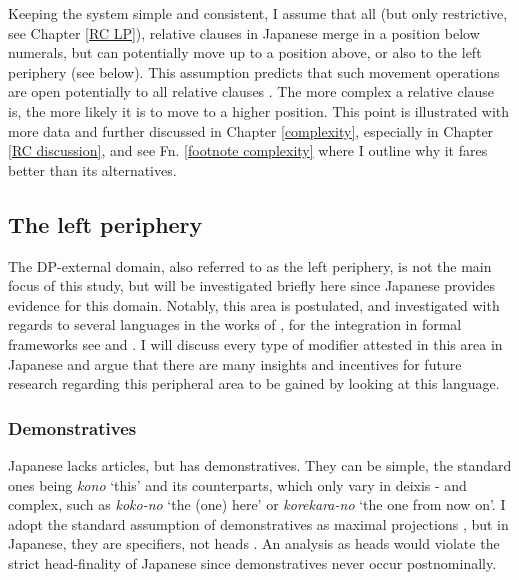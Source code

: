 \documentclass [output=book,colorlinks,citecolor=brown]{langscibook}
\begin{document}
Keeping the system simple and consistent, I assume that all (but only restrictive, see Chapter \ref{RC LP}), relative clauses in Japanese merge in a position below numerals, but can potentially move up to a position above, or also to the left periphery (see below). This assumption predicts that such movement operations are open potentially to all relative clauses \citep{kim:2019:syntax}. The more complex a relative clause is, the more likely it is to move to a higher position. This point is illustrated with more data and further discussed in Chapter \ref{complexity}, especially in Chapter \ref{RC discussion}, and see Fn. \ref{footnote complexity} where I outline why it fares better than its alternatives.

\subsection{The left periphery} \label{externaldp}

The DP-external domain, also referred to as the left periphery, is not the main focus of this study, but will be investigated briefly here since Japanese provides evidence for this domain. Notably, this area is postulated, and investigated with regards to several languages in the works of \citet{giusti:1996:is, dimitrova:1998:fragments, ihsane:2001:specific, aboh:2004:topic, aboh:2006:when, roca:2009:left, bastos:2011:info, giusti:2016:latin, roehrs:2019:left, roehrs:2025:DP, kim:2019:syntax}, for the integration in formal frameworks see \citet{laenzlinger:2011:elements} and \citet{grohmann:2003:prolific}. I will discuss every type of modifier attested in this area in Japanese and argue that there are many insights and incentives for future research regarding this peripheral area to be gained by looking at this language. %

\subsubsection{Demonstratives}

Japanese lacks articles, but has demonstratives. They can be simple, the standard ones being \textit{kono} `this’ and its counterparts, which only vary in deixis - and complex, such as \textit{koko-no} `the (one) here’ or \textit{korekara-no} `the one from now on’. I adopt the standard assumption of demonstratives as maximal projections \citep{laenzlinger:2005:french, laenzlinger:2011:elements, kim:2019:syntax}, but in Japanese, they are specifiers, not heads \citep{kuno:1973:structure, kuroda:1992:japanese}. An analysis as heads would violate the strict head-finality of Japanese since demonstratives never occur postnominally. %
\end{document}
